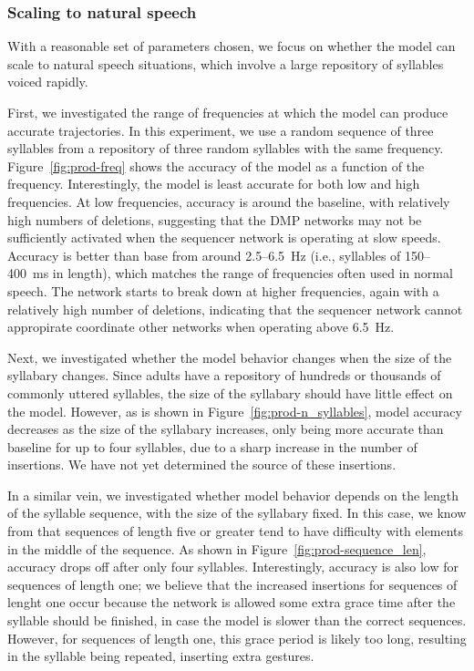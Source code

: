\subsubsection{Scaling to natural speech}

With a reasonable set of parameters chosen,
we focus on whether the model
can scale to natural speech situations,
which involve
a large repository of syllables
voiced rapidly.


First, we investigated the
range of frequencies at which the model
can produce accurate trajectories.
In this experiment, we use a random sequence
of three syllables from a
repository of three random syllables
with the same frequency.
Figure~\ref{fig:prod-freq} shows the accuracy
of the model as a function of the frequency.
Interestingly, the model is least accurate
for both low and high frequencies.
At low frequencies, accuracy is around
the baseline, with relatively high
numbers of deletions,
suggesting that the DMP networks
may not be sufficiently activated
when the sequencer network
is operating at slow speeds.
Accuracy is better than base
from around 2.5--6.5~Hz
(i.e., syllables of 150--400~ms in length),
which matches the range of frequencies
often used in normal speech.
The network starts to break down
at higher frequencies,
again with a relatively high number
of deletions, indicating that
the sequencer network
cannot appropirate coordinate
other networks when operating
above 6.5~Hz.


Next, we investigated whether the model
behavior changes when the size
of the syllabary changes.
Since adults have a repository
of hundreds or thousands
of commonly uttered syllables,
the size of the syllabary should have
little effect on the model.
However, as is shown in Figure~\ref{fig:prod-n_syllables},
model accuracy decreases
as the size of the syllabary increases,
only being more accurate than baseline
for up to four syllables,
due to a sharp increase
in the number of insertions.
We have not yet determined the source
of these insertions.


In a similar vein,
we investigated whether model behavior
depends on the length of the syllable sequence,
with the size of the syllabary fixed.
In this case, we know from \citet{choo2010}
that sequences of length five or greater
tend to have difficulty with elements
in the middle of the sequence.
As shown in Figure~\ref{fig:prod-sequence_len},
accuracy drops off after only four syllables.
Interestingly, accuracy is also low
for sequences of length one;
we believe that the increased insertions
for sequences of lenght one occur
because the network is allowed some
extra grace time after the syllable should
be finished, in case the model
is slower than the correct sequences.
However, for sequences of length one,
this grace period is likely too long,
resulting in the syllable
being repeated,
inserting extra gestures.

